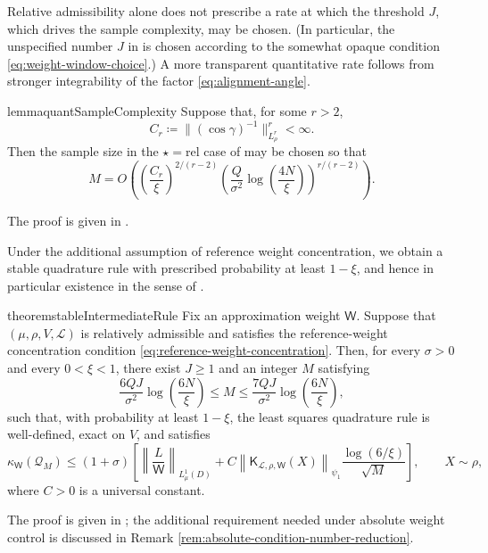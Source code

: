 \documentclass[10pt,dvipsnames]{amsart}
\begin{document}
Relative admissibility alone does not prescribe a rate at which the threshold
\(J\), which drives the sample complexity, may be chosen. (In particular, the
unspecified number $J$ in  is
chosen according to the somewhat opaque condition
\eqref{eq:weight-window-choice}.) A more transparent quantitative rate follows
from stronger integrability of the factor \eqref{eq:alignment-angle}. 
\begin{restatable}{lemma}{quantSampleComplexity}
\label{lem:quant-sample-complexity}
Suppose that, for some \(r>2\),
\[
    C_r
    \coloneqq
    \|(\cos\gamma)^{-1}\|_{L^r_\rho}^r
    <
    \infty.
\]
Then the sample size in the $\star = \mathrm{rel}$ case of
 may be chosen so that
\[
    M
    =
    O\left(
        \left(\frac{C_r}{\xi}\right)^{2/(r-2)}
        \left(
            \frac{Q}{\sigma^2}\log\left(\frac{4N}{\xi}\right)
        \right)^{r/(r-2)}
    \right).
\]
\end{restatable}
\noindent The proof is given in .

Under the additional assumption of reference weight concentration, we obtain a
stable quadrature rule with prescribed probability at least \(1-\xi\), and
hence in particular existence in the sense of
.

\begin{restatable}{theorem}{stableIntermediateRule}
\label{thm:stable-intermediate-rule}
Fix an approximation weight \(\mathsf W\). Suppose that
\((\mu,\rho,V,\mathcal L)\) is relatively admissible and satisfies the
reference-weight concentration condition
\eqref{eq:reference-weight-concentration}. Then, for every \(\sigma>0\) and every $0<\xi<1$,
there exist \(J\geq1\) and an integer \(M\) satisfying
\begin{equation}
\label{eq:stable-M-window}
    \frac{6QJ}{\sigma^2}\log\left(\frac{6N}{\xi}\right)
    \leq
    M
    \leq
    \frac{7QJ}{\sigma^2}\log\left(\frac{6N}{\xi}\right),
\end{equation}
such that, with probability at least $1-\xi$, the least squares quadrature rule is
well-defined, exact on \(V\), and satisfies
\[
    \kappa_{\mathsf W}(\mathcal Q_M)
    \leq
    (1+\sigma)
    \left[
        \left\|
            \frac{L}{\mathsf W}
        \right\|_{L^1_\mu(D)}
        +
        C
        \left\|
            \mathsf K_{\mathcal L,\rho,\mathsf W}(X)
        \right\|_{\psi_1}
        \frac{\log(6/\xi)}{\sqrt{M}}
    \right],
    \qquad X\sim\rho,
\]
where \(C>0\) is a universal constant.
\end{restatable}
\noindent The proof is given in ; the additional requirement needed under absolute weight control is discussed in Remark \ref{rem:absolute-condition-number-reduction}.
\end{document}
